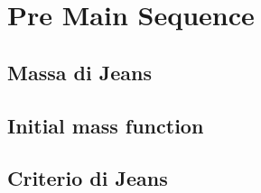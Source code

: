 \section{Pre Main Sequence}\label{sec:pre-main-sequence}

\subsection{Massa di Jeans}
\subsection{Initial mass function}
\subsection{Criterio di Jeans}
